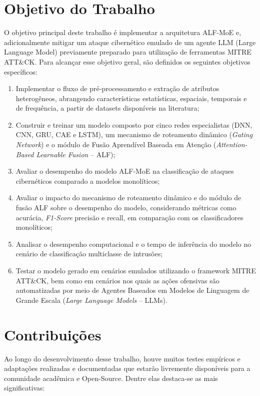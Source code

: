 \section{Objetivo do Trabalho}
\label{sec:objetivos}

O objetivo principal deste trabalho é implementar a arquitetura ALF-MoE e, adicionalmente mitigar um ataque cibernético emulado de um agente LLM (Large Language Model) previamente preparado para utilização de ferramentas MITRE ATT\&CK. Para alcançar esse objetivo geral, são definidos os seguintes objetivos específicos:

\begin{enumerate}
\item Implementar o fluxo de pré-processamento e extração de atributos heterogêneos, abrangendo características estatísticas, espaciais, temporais e de frequência, a partir de datasets disponíveis na literatura;
\item Construir e treinar um modelo composto por cinco redes especialistas (DNN, CNN, GRU, CAE e LSTM), um mecanismo de roteamento dinâmico (\emph{Gating Network}) e o módulo de Fusão Aprendível Baseada em Atenção (\emph{Attention-Based Learnable Fusion} -- ALF);
\item Avaliar o desempenho do modelo ALF-MoE na classificação de ataques cibernéticos comparado a modelos monolíticos;
\item Avaliar o impacto do mecanismo de roteamento dinâmico e do módulo de fusão ALF sobre o desempenho do modelo, considerando métricas como acurácia, \emph{F1-Score} precisão e recall, em comparação com os classificadores monolíticos;
\item Analisar o desempenho computacional e o tempo de inferência do modelo no cenário de classificação multiclasse de intrusões;
\item Testar o modelo gerado em cenários emulados utilizando o framework MITRE ATT\&CK, bem como em cenários nos quais as ações ofensivas são automatizadas por meio de Agentes Baseados em Modelos de Linguagem de Grande Escala (\emph{Large Language Models} -- LLMs).

\end{enumerate}

\section{Contribuições}

Ao longo do desenvolvimento desse trabalho, houve muitos testes empíricos e adaptações realizadas e documentadas que estarão livremente disponíveis para a comunidade acadêmica e Open-Source. Dentre elas destaca-se as mais significativas:

